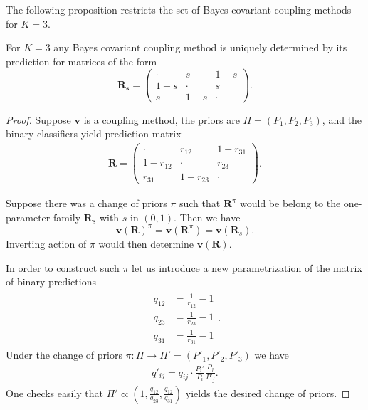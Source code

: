 The following proposition restricts the set of Bayes covariant coupling methods for $K=3$.

\begin{prop} \label{prop:bc3}
	For $K=3$ any Bayes covariant coupling method is uniquely determined by its prediction for  matrices of the form
	$$
	\boldsymbol{R_s} = \begin{pmatrix} \cdot & s & 1 -s \\  1-s & \cdot & s \\ s & 1-s & \cdot \end{pmatrix}.
	$$
\end{prop}
\begin{proof}
	Suppose $\boldsymbol{v}$ is a coupling method,  the priors are $\Pi = (P_1, P_2,P_3)$, and the binary classifiers yield prediction matrix 
	\begin{align}
		\boldsymbol{R} = \begin{pmatrix} \cdot & r_{12} & 1 - r_{31} \\ 1-r_{12} & \cdot & r_{23} \\
			r_{31} & 1- r_{23} & \cdot \end{pmatrix}.
	\end{align}
	
	Suppose there was a change of priors $\pi$ such that $\boldsymbol{R}^\pi$ would be belong to the one-parameter family $\boldsymbol{R}_s$ with $s$ in $(0,1)$. Then we have
	$$
	\boldsymbol{v}(\boldsymbol{R})^\pi = \boldsymbol{v}(\boldsymbol{R}^\pi) = \boldsymbol{v}(\boldsymbol{R}_s).
	$$
	Inverting action of $\pi$ would then determine $\boldsymbol{v}(\boldsymbol{R})$.
	
	In order to construct such $\pi$ let us introduce a new parametrization of the matrix of binary  predictions
	\begin{align}
		\begin{split}
			q_{12} &= \frac{1}{r_{12}} -1 \\
			q_{23} &= \frac{1}{r_{23}} -1 \\
			q_{31} &= \frac{1}{r_{31}} -1 
		\end{split}.
	\end{align}
	Under the change of priors $\pi:\Pi \rightarrow \Pi' = (P'_1, P'_2, P'_3)$ we have
	\begin{align}
		q'_{ij}	= q_{ij} \cdot \frac{P_i'}{P_i} \frac{P_j}{P'_j}.
	\end{align}
	One checks easily that $\Pi' \propto (1, \frac{q_{12}}{q_{23}}, \frac{q_{12}}{q_{31}})$ yields the desired change of priors.
	
\end{proof}


